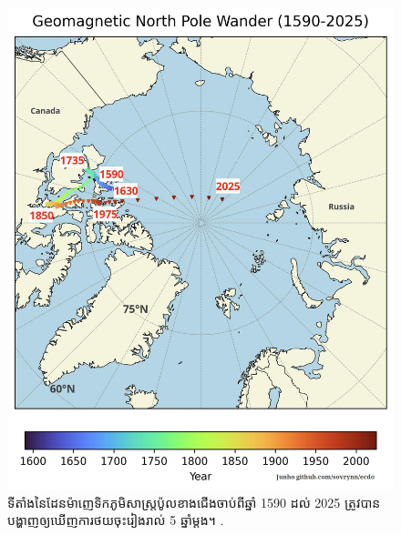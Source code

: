 \documentclass[10pt,twocolumn,letterpaper]{article}
\begin{document}
\begin{figure}[t]
\begin{center}
   \includegraphics[width=1\linewidth]{npw.jpg}
\end{center}
\caption{ទីតាំងនៃដែនម៉ាញេទិកភូមិសាស្ត្រប៉ូលខាងជើងចាប់ពីឆ្នាំ 1590 ដល់ 2025 ត្រូវបានបង្ហាញឲ្យឃើញការថយចុះរៀងរាល់ 5 ឆ្នាំម្តង។ \cite{142}.}
\label{fig:13}
\label{fig:onecol}
\end{figure}
\end{document}
